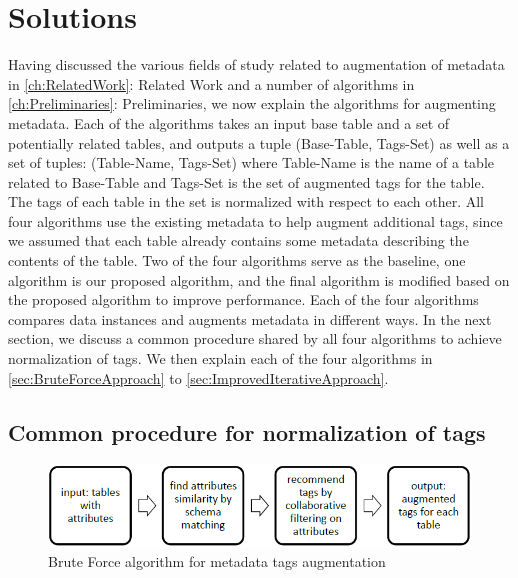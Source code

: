 
\chapter{Solutions}
\label{ch:Solutions}

Having discussed the various fields of study related to augmentation of metadata in \autoref{ch:RelatedWork}: Related Work and a number of algorithms in \autoref{ch:Preliminaries}: Preliminaries, we now explain the algorithms for augmenting metadata. Each of the algorithms takes an input base table and a set of potentially related tables, and outputs a tuple (Base-Table, Tags-Set) as well as a set of tuples:
(Table-Name, Tags-Set)
where Table-Name is the name of a table related to Base-Table and Tags-Set is the set of augmented tags for the table. The tags of each table in the set is normalized with respect to each other.
All four algorithms use the existing metadata to help augment additional tags, since we assumed that each table already contains some metadata describing the contents of the table. Two of the four algorithms serve as the baseline, one algorithm is our proposed algorithm, and the final algorithm is modified based on the proposed algorithm to improve performance. Each of the four algorithms compares data instances and augments metadata in different ways. In the next section, we discuss a common procedure shared by all four algorithms to achieve normalization of tags. We then explain each of the four algorithms in \autoref{sec:BruteForceApproach} to \autoref{sec:ImprovedIterativeApproach}.

\section{Common procedure for normalization of tags}
\label{sec:CommonProcedureForNormalizationOfTags}

\begin{figure}
    \centering
    \includegraphics[width=5in]{figures/brute-force-algorithm.png}
    \caption{Brute Force algorithm for metadata tags augmentation}
    \label{fig:brute-force-algorithm}
\end{figure}

